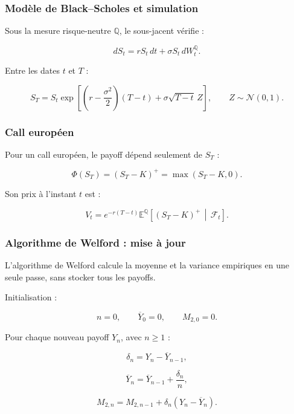 \documentclass[aspectratio=169,11pt]{beamer}
\begin{document}
\begin{frame}
    \frametitle{Modèle de Black--Scholes et simulation}

    Sous la mesure risque-neutre $\mathbb{Q}$, le sous-jacent vérifie :

    \[
        \boxed{
        dS_t
        =
        rS_t\,dt
        +
        \sigma S_t\,dW_t^{\mathbb{Q}}.
        }
    \]

    Entre les dates $t$ et $T$ :

    \[
        S_T
        =
        S_t
        \exp\left[
            \left(r-\frac{\sigma^2}{2}\right)(T-t)
            +
            \sigma\sqrt{T-t}\,Z
        \right],
        \qquad
        Z\sim\mathcal{N}(0,1).
    \]

\end{frame}

\begin{frame}
    \frametitle{Call européen}

    Pour un call européen, le payoff dépend seulement de $S_T$ :

    \[
        \boxed{
        \Phi(S_T)
        =
        (S_T-K)^+
        =
        \max(S_T-K,0).
        }
    \]

    Son prix à l'instant $t$ est :

    \[
        \boxed{
        V_t
        =
        e^{-r(T-t)}
        \mathbb{E}^{\mathbb{Q}}
        \left[
            (S_T-K)^+
            \,\middle|\,
            \mathcal{F}_t
        \right].
        }
    \]

\end{frame}

\begin{frame}
    \frametitle{Algorithme de Welford : mise à jour}

    L'algorithme de Welford calcule la moyenne et la variance
    empiriques en une seule passe, sans stocker tous les payoffs.

    \vspace{0.3cm}

    Initialisation :

    \[
        n=0,
        \qquad
        \overline{Y}_0=0,
        \qquad
        M_{2,0}=0.
    \]

    Pour chaque nouveau payoff $Y_n$, avec $n\geq 1$ :

    \[
        \delta_n
        =
        Y_n-\overline{Y}_{n-1},
    \]

    \[
        \overline{Y}_n
        =
        \overline{Y}_{n-1}
        +
        \frac{\delta_n}{n},
    \]

    \[
        M_{2,n}
        =
        M_{2,n-1}
        +
        \delta_n
        \left(
            Y_n-\overline{Y}_n
        \right).
    \]

\end{frame}
\end{document}
